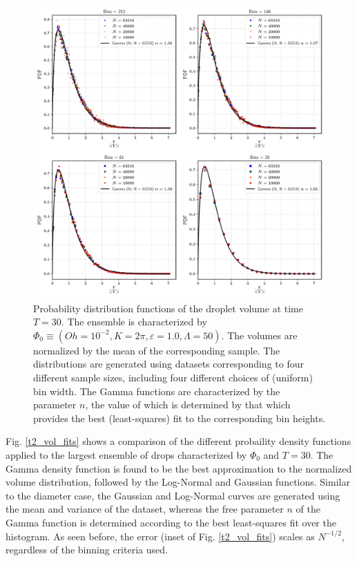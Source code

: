\begin{figure}
\centering
\includegraphics{plots/drop_stats/long_time_volume_bins.pdf}
\caption{Probability distribution functions of the droplet volume at time $T = 30$. 
The ensemble is characterized by $\Phi_0 \equiv \left( Oh = 10^{-2}, K = 2\pi , \varepsilon = 1.0 , \Lambda = 50 \right)$. 
The volumes are normalized by the mean of the corresponding sample.  
The distributions are generated using datasets corresponding to four different sample sizes, 
including four different choices of (uniform) bin width. 
The Gamma functions are characterized by the parameter $n$, the value of which is determined 
by that which provides the best (least-squares) fit to the corresponding bin heights.  
	}
\label{t2_vol_bins}
\end{figure}

Fig. \ref{t2_vol_fits} shows a comparison of the different probaility 
density functions applied to the largest ensemble of drops characterized by $\Phi_0$ and $T=30$. 
The Gamma density function is found to be the best approximation to the normalized 
volume distribution, followed by the Log-Normal and Gaussian functions.
Similar to the diameter case, the Gaussian and Log-Normal curves are 
generated using the mean and variance of the dataset, 
whereas the free parameter $n$ of the Gamma function is determined
according to the best least-squares fit over the histogram. 
As seen before, the error (inset of Fig. \ref{t2_vol_fits}) 
scales as $N^{-1/2}$, regardless of the binning criteria used. 

